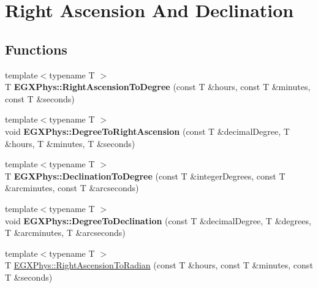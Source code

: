 \hypertarget{group___e_g_x_phys-_right_ascension_and_declination}{}\section{Right Ascension And Declination}
\label{group___e_g_x_phys-_right_ascension_and_declination}
\subsection*{Functions}
\begin{DoxyCompactItemize}
\item 
\mbox{\label{group___e_g_x_phys-_right_ascension_and_declination_ga30e95e529dac871efc014c8ca0108c0d}} 
{\footnotesize template$<$typename T $>$ }\\T {\bfseries E\+G\+X\+Phys\+::\+Right\+Ascension\+To\+Degree} (const T \&hours, const T \&minutes, const T \&seconds)
\item 
\mbox{\label{group___e_g_x_phys-_right_ascension_and_declination_gabdd9d1c686dd5e2580518f526b78295f}} 
{\footnotesize template$<$typename T $>$ }\\void {\bfseries E\+G\+X\+Phys\+::\+Degree\+To\+Right\+Ascension} (const T \&decimal\+Degree, T \&hours, T \&minutes, T \&seconds)
\item 
\mbox{\label{group___e_g_x_phys-_right_ascension_and_declination_gadcadb4f709a5115a8edb18c872af9eda}} 
{\footnotesize template$<$typename T $>$ }\\T {\bfseries E\+G\+X\+Phys\+::\+Declination\+To\+Degree} (const T \&integer\+Degrees, const T \&arcminutes, const T \&arcseconds)
\item 
\mbox{\label{group___e_g_x_phys-_right_ascension_and_declination_ga4f3c37a00f59722857bcd4e6acd01865}} 
{\footnotesize template$<$typename T $>$ }\\void {\bfseries E\+G\+X\+Phys\+::\+Degree\+To\+Declination} (const T \&decimal\+Degree, T \&degrees, T \&arcminutes, T \&arcseconds)
\item 
{\footnotesize template$<$typename T $>$ }\\T \mbox{\hyperlink{group___e_g_x_phys-_right_ascension_and_declination_gad90de181361375b745a9b226fa13ba14}{E\+G\+X\+Phys\+::\+Right\+Ascension\+To\+Radian}} (const T \&hours, const T \&minutes, const T \&seconds)

\end{DoxyCompactItemize}
